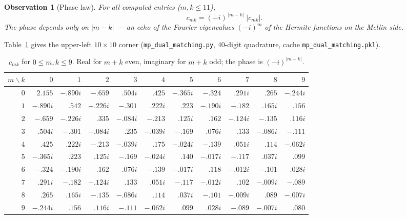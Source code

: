 \documentclass[11pt,a4paper]{article}
\theoremstyle{definition}
\theoremstyle{plain}
\newtheorem{observation}[definition]{Observation}
\begin{document}
\begin{observation}[Phase law]\label{obs:phase}
For all computed entries ($m, k \le 11$),
\[
  c_{mk} = (-i)^{\,|m-k|}\; |c_{mk}|.
\]
The phase depends only on $|m-k|$ --- an echo of the Fourier
eigenvalues $(-i)^m$ of the Hermite functions on the Mellin side.
\end{observation}

Table~\ref{tab:numeric} gives the upper-left $10 \times 10$ corner
(\texttt{mp\_dual\_matching.py}, 40-digit quadrature, cache
\texttt{mp\_dual\_matching.pkl}).

\begin{table}[ht]
\centering
\caption{$c_{mk}$ for $0 \le m, k \le 9$. Real for $m+k$ even,
imaginary for $m+k$ odd; the phase is $(-i)^{|m-k|}$.}
\label{tab:numeric}
\scriptsize
\setlength{\tabcolsep}{3.5pt}
\begin{tabular}{r|rrrrrrrrrr}
\toprule
$m \backslash k$ & $0$ & $1$ & $2$ & $3$ & $4$ & $5$ & $6$ & $7$ & $8$ & $9$ \\
\midrule
$0$ & $2.155$ & $-.890i$ & $-.659$ & $.504i$ & $.425$ & $-.365i$ & $-.324$ & $.291i$ & $.265$ & $-.244i$ \\
$1$ & $-.890i$ & $.542$ & $-.226i$ & $-.301$ & $.222i$ & $.223$ & $-.190i$ & $-.182$ & $.165i$ & $.156$ \\
$2$ & $-.659$ & $-.226i$ & $.335$ & $-.084i$ & $-.213$ & $.125i$ & $.162$ & $-.124i$ & $-.135$ & $.116i$ \\
$3$ & $.504i$ & $-.301$ & $-.084i$ & $.235$ & $-.039i$ & $-.169$ & $.076i$ & $.133$ & $-.086i$ & $-.111$ \\
$4$ & $.425$ & $.222i$ & $-.213$ & $-.039i$ & $.175$ & $-.024i$ & $-.139$ & $.051i$ & $.114$ & $-.062i$ \\
$5$ & $-.365i$ & $.223$ & $.125i$ & $-.169$ & $-.024i$ & $.140$ & $-.017i$ & $-.117$ & $.037i$ & $.099$ \\
$6$ & $-.324$ & $-.190i$ & $.162$ & $.076i$ & $-.139$ & $-.017i$ & $.118$ & $-.012i$ & $-.101$ & $.028i$ \\
$7$ & $.291i$ & $-.182$ & $-.124i$ & $.133$ & $.051i$ & $-.117$ & $-.012i$ & $.102$ & $-.009i$ & $-.089$ \\
$8$ & $.265$ & $.165i$ & $-.135$ & $-.086i$ & $.114$ & $.037i$ & $-.101$ & $-.009i$ & $.089$ & $-.007i$ \\
$9$ & $-.244i$ & $.156$ & $.116i$ & $-.111$ & $-.062i$ & $.099$ & $.028i$ & $-.089$ & $-.007i$ & $.080$ \\
\bottomrule
\end{tabular}
\end{table}
\end{document}
